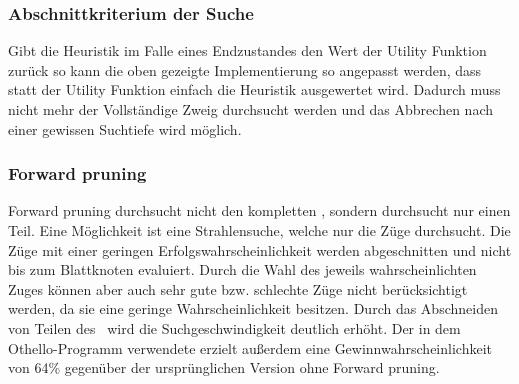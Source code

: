 \subsubsection{Abschnittkriterium der Suche}
Gibt die Heuristik im Falle eines Endzustandes den Wert der Utility Funktion zurück so kann die oben gezeigte Implementierung so angepasst werden, dass statt der Utility Funktion einfach die Heuristik ausgewertet wird. Dadurch muss nicht mehr der Vollständige Zweig durchsucht werden und das Abbrechen nach einer gewissen Suchtiefe wird möglich.
 
\subsubsection{Forward pruning}
Forward pruning durchsucht nicht den kompletten \gtree , sondern durchsucht nur einen Teil. Eine Möglichkeit ist eine Strahlensuche, welche nur die  Züge durchsucht. Die Züge mit einer geringen Erfolgswahrscheinlichkeit werden abgeschnitten und nicht bis zum Blattknoten evaluiert. Durch die Wahl des jeweils wahrscheinlichten Zuges können aber auch sehr gute bzw. schlechte Züge nicht berücksichtigt werden, da sie eine geringe Wahrscheinlichkeit besitzen. Durch das Abschneiden von Teilen des \gtree\ wird die Suchgeschwindigkeit deutlich erhöht. Der in dem Othello-Programm  verwendete  erzielt außerdem eine Gewinnwahrscheinlichkeit von 64\% gegenüber der ursprünglichen Version ohne Forward pruning.
